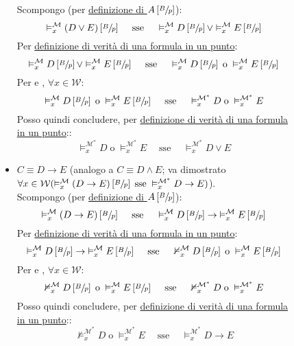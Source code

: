 \documentclass[a4paper,12pt]{article}
\newcommand{\latinmath}[1]{\text{\latinmodern{#1}}} %
\begin{document}
\begin{description}
\begin{dimo}
\begin{dimo}
\begin{description}
\begin{itemize}
					Scompongo (per \hyperlink{defsu}{definizione di $A \left[\sfrac{B}{p}\right]$}):
					$$\vDash_x^{\mathcal{M}} (D \lor E)\left[\sfrac{B}{p}\right] \quad \; \text{sse} \quad\; \vDash_x^{\mathcal{M}} D\left[\sfrac{B}{p}\right] \lor \vDash_x^{\mathcal{M}} E\left[\sfrac{B}{p}\right] $$
					Per \hyperlink{defverp}{definizione di verità di una formula in un punto}:
					$$\vDash_x^{\mathcal{M}} D\left[\sfrac{B}{p}\right] \lor \vDash_x^{\mathcal{M}} E\left[\sfrac{B}{p}\right] \quad\; \text{sse} \quad\; \vDash_x^{\mathcal{M}} D\left[\sfrac{B}{p}\right] \; \text{o} \; \vDash_x^{\mathcal{M}} E\left[\sfrac{B}{p}\right]$$
					Per \latinmath{IH1} e \latinmath{IH2}, $\forall x \in \mathcal{W}$:
					$$\vDash_x^{\mathcal{M}} D\left[\sfrac{B}{p}\right] \; \text{o} \; \vDash_x^{\mathcal{M}} E\left[\sfrac{B}{p}\right] \quad\; \text{sse} \quad\; \vDash_x^{\mathcal{M^{\ast}}} D \; \text{o} \; \vDash_x^{\mathcal{M^{\ast}}} E$$
					Posso quindi concludere, per \hyperlink{defverp}{definizione di verità di una formula in un punto}::
					$$\vDash_x^{\mathcal{M^{\ast}}} D \; \text{o} \; \vDash_x^{\mathcal{M^{\ast}}} E \quad\; \text{sse} \quad\; \vDash_x^{\mathcal{M^{\ast}}} D \lor E$$
					\item $C \equiv D \to E$ (analogo a $C \equiv D \land E$; va dimostrato \emph{$\forall x \in \mathcal{W} (\vDash_x^{\mathcal{M}} (D \to E)\left[\sfrac{B}{p}\right] \; \text{sse} \; \vDash_x^{\mathcal{M^{\ast}}} D \to E)$}). \\
					Scompongo (per \hyperlink{defsu}{definizione di $A \left[\sfrac{B}{p}\right]$}):
					$$\vDash_x^{\mathcal{M}} (D \to E)\left[\sfrac{B}{p}\right] \quad \; \text{sse} \quad\; \vDash_x^{\mathcal{M}} D\left[\sfrac{B}{p}\right] \to \; \vDash_x^{\mathcal{M}} E\left[\sfrac{B}{p}\right] $$
					Per \hyperlink{defverp}{definizione di verità di una formula in un punto}:
					$$\vDash_x^{\mathcal{M}} D\left[\sfrac{B}{p}\right] \to \; \vDash_x^{\mathcal{M}} E\left[\sfrac{B}{p}\right] \quad\; \text{sse} \quad\; \nvDash_x^{\mathcal{M}} D\left[\sfrac{B}{p}\right] \; \text{o} \; \vDash_x^{\mathcal{M}} E\left[\sfrac{B}{p}\right]$$
					Per \latinmath{IH1} e \latinmath{IH2}, $\forall x \in \mathcal{W}$:
					$$\nvDash_x^{\mathcal{M}} D\left[\sfrac{B}{p}\right] \; \text{o} \; \vDash_x^{\mathcal{M}} E\left[\sfrac{B}{p}\right] \quad\; \text{sse} \quad\; \nvDash_x^{\mathcal{M^{\ast}}} D \; \text{o} \; \vDash_x^{\mathcal{M^{\ast}}} E$$
					Posso quindi concludere, per \hyperlink{defverp}{definizione di verità di una formula in un punto}::
					$$\nvDash_x^{\mathcal{M^{\ast}}} D \; \text{o} \; \vDash_x^{\mathcal{M^{\ast}}} E \quad\; \text{sse} \quad\; \vDash_x^{\mathcal{M^{\ast}}} D \to E$$

\end{itemize}
\end{description}
\end{dimo}
\end{dimo}
\end{description}
\end{document}
